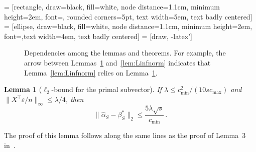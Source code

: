 \documentclass{elsarticle}
\newtheorem{lemma}{Lemma}
\def\T{\top}
\newcommand\norm[1]{\lVert#1\rVert}
\newcommand{\trueparas}{{\beta^*_{S}}}
\newcommand{\tuning}{{\lambda}}
\newcommand{\prims}{{\hat{\alpha}_{S}}}
\begin{document}
 = [rectangle, draw=black, fill=white, node distance=1.1cm, minimum height=2em, font=\color{black}\sffamily, rounded corners=5pt, text width=5em, text badly centered]
 = [ellipse, draw=black, fill=white, node distance=1.1cm, minimum height=2em, font=\color{black}\sffamily,text width=4em, text badly centered]
 = [draw, -latex']


 \begin{figure}[h!]
 \centering
\caption{Dependencies among the lemmas and theorems. For example, the arrow between Lemmas~\ref{lem:L2norm} and~\ref{lem:Linfnorm} indicates that Lemma~\ref{lem:Linfnorm} relies on Lemma~\ref{lem:L2norm}.}
\label{fig:dependence}
\end{figure}
\begin{lemma}[$\ell_{2}$-bound for the primal subvector]
\label{lem:L2norm}
  If $\tuning \leq c_{\min}^2/ (10 sc_{\max})$
   and $\norm{X^\T\varepsilon/n}_{\infty} \leq \tuning/4$,
    then
  \[
  \norm{\prims-\trueparas}_2\leq \frac{5\tuning \surd{s}}{c_{\min}}\,.
  \]
\end{lemma}
\noindent The proof of this lemma follows along the same lines as the proof of Lemma~3 in~\citep{ravikumar2010high}.
\end{document}
